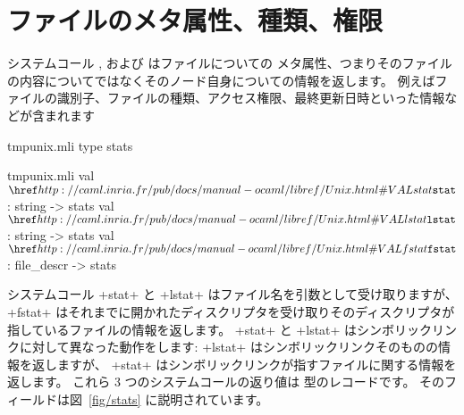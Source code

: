 \section{ファイルのメタ属性、種類、権限}

システムコール ,  および  はファイルについての
メタ属性、つまりそのファイルの内容についてではなくそのノード自身についての情報を返します。
例えばファイルの識別子、ファイルの種類、アクセス権限、最終更新日時といった情報などが含まれます
%
\begin{codefile}{tmpunix.mli}
type stats
\end{codefile}
%
\begin{listingcodefile}{tmpunix.mli}
val $\libvalue{Unix}{stat}$  : string -> stats
val $\libvalue{Unix}{lstat}$ : string -> stats
val $\libvalue{Unix}{fstat}$ : file_descr -> stats
\end{listingcodefile}
%
システムコール \ml+stat+ と \ml+lstat+ はファイル名を引数として受け取りますが、
\ml+fstat+ はそれまでに開かれたディスクリプタを受け取りそのディスクリプタが指しているファイルの情報を返します。
\ml+stat+ と \ml+lstat+ はシンボリックリンクに対して異なった動作をします:
\ml+lstat+ はシンボリックリンクそのものの情報を返しますが、
\ml+stat+ はシンボリックリンクが指すファイルに関する情報を返します。
これら 3 つのシステムコールの返り値は  型のレコードです。
そのフィールドは図~\ref{fig/stats} に説明されています。
%
